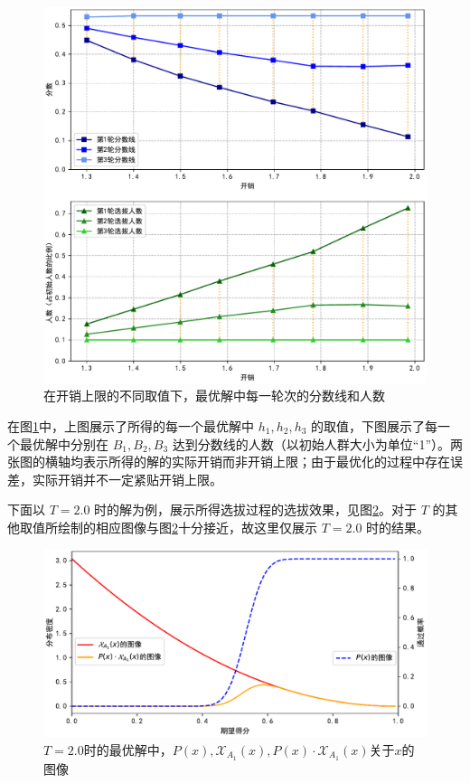         \begin{figure}[htbp]
            \centering
            \includegraphics[width=\textwidth]{fig/plottingH1H2H3.pdf}
            \caption{在开销上限的不同取值下，最优解中每一轮次的分数线和人数}
            \label{fig:plottingH1H2H3}
        \end{figure}

        在图\ref{fig:plottingH1H2H3}中，上图展示了所得的每一个最优解中 $h_1,h_2,h_3$ 的取值，下图展示了每一个最优解中分别在 $B_1,B_2,B_3$ 达到分数线的人数（以初始人群大小为单位“1”）。两张图的横轴均表示所得的解的实际开销而非开销上限；由于最优化的过程中存在误差，实际开销并不一定紧贴开销上限。

        \vspace{1.5ex}

        下面以 $T=2.0$ 时的解为例，展示所得选拔过程的选拔效果，见图\ref{fig:plottingOptimizedDistri}。对于 $T$ 的其他取值所绘制的相应图像与图\ref{fig:plottingOptimizedDistri}十分接近，故这里仅展示 $T=2.0$ 时的结果。

        \begin{figure}[htbp]
            \centering
            \includegraphics[width=\textwidth]{fig/plottingDistriInOptimizedArrangement.pdf}
            \caption{$T=2.0$时的最优解中，$P(x),\mathcal{X}_{A_1}(x),P(x)\cdot\mathcal{X}_{A_1}(x)$关于$x$的图像}
            \label{fig:plottingOptimizedDistri}
        \end{figure}

